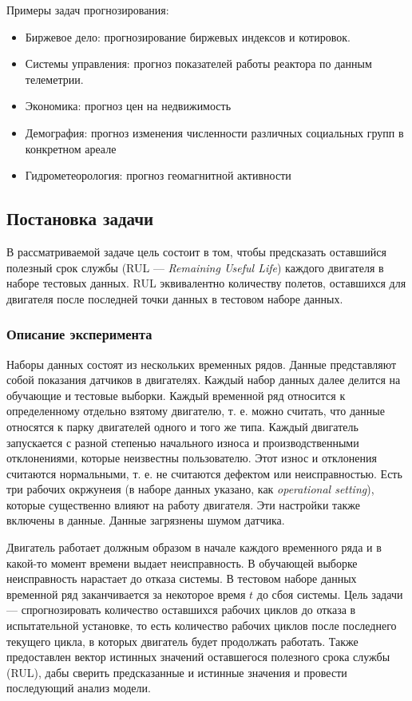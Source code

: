 \documentclass[14pt]{extarticle}
\begin{document}
Примеры задач прогнозирования:
\begin{itemize}
	
	\item Биржевое дело: прогнозирование биржевых индексов и котировок.
	\item Системы управления: прогноз показателей работы реактора по данным телеметрии.
	\item Экономика: прогноз цен на недвижимость
	\item Демография: прогноз изменения численности различных социальных групп в конкретном ареале
	\item Гидрометеорология: прогноз геомагнитной активности
	
\end{itemize}

\subsection{Постановка задачи}

В рассматриваемой задаче цель состоит в том, чтобы предсказать оставшийся полезный срок службы (RUL --- {\it Remaining Useful Life}) каждого двигателя в наборе тестовых данных. RUL эквивалентно количеству полетов, оставшихся для двигателя после последней точки данных в тестовом наборе данных.

\subsubsection{Описание эксперимента}

Наборы данных состоят из нескольких временных рядов. Данные представляют собой показания датчиков в двигателях. Каждый набор данных далее делится на обучающие и тестовые выборки. Каждый временной ряд относится к определенному отдельно взятому двигателю, т. е. можно считать, что данные относятся к парку двигателей одного и того же типа. Каждый двигатель запускается с разной степенью начального износа и производственными отклонениями, которые неизвестны пользователю. Этот износ и отклонения считаются нормальными, т. е. не считаются дефектом или неисправностью. Есть три рабочих окржунеия (в наборе данных указано, как {\it operational setting}), которые существенно влияют на работу двигателя. Эти настройки также включены в данные. Данные загрязнены шумом датчика.

Двигатель работает должным образом в начале каждого временного ряда и в какой-то момент времени выдает неисправность. В обучающей выборке неисправность нарастает до отказа системы. В тестовом наборе данных временной ряд заканчивается за некоторое время $t$ до сбоя системы. Цель задачи --- спрогнозировать количество оставшихся рабочих циклов до отказа в испытательной установке, то есть количество рабочих циклов после последнего текущего цикла, в которых двигатель будет продолжать работать. Также предоставлен вектор истинных значений оставшегося полезного срока службы (RUL), дабы сверить предсказанные и истинные значения и провести последующий анализ модели. 
\end{document}
